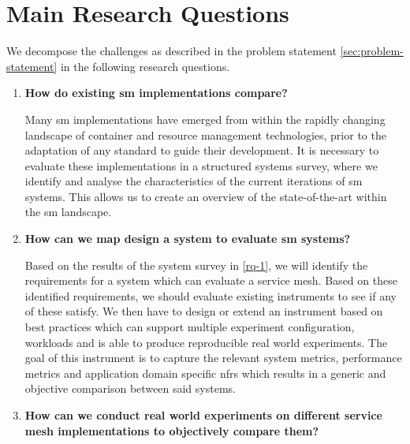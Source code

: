 \section{Main Research Questions}
\label{sec:research-questions}

We decompose the challenges as described in the problem statement \cref{sec:problem-statement} in the following research questions.




\begin{enumerate}[label=\textbf{RQ\arabic*}, leftmargin=3\parindent]
    \item \textbf{How do existing \gls{sm} implementations compare?}
    \label{rq-1}
    
    Many \gls{sm} implementations have emerged from within the rapidly changing landscape of container and resource management technologies, prior to the adaptation of any standard to guide their development. It is necessary to evaluate these implementations in a structured systems survey, where we identify and analyse the characteristics of the current iterations of \gls{sm} systems. This allows us to create an overview of the state-of-the-art within the \gls{sm} landscape.
    
    \item \textbf{How can we map design a system to evaluate \gls{sm} systems?}
    \label{rq-2}
    
    Based on the results of the system survey in \ref{rq-1}, we will identify the requirements for a system which can evaluate a service mesh. Based on these identified requirements, we should evaluate existing instruments to see if any of these satisfy. We then have to design or extend an instrument based on best practices \cite{folkerts2012benchmarking} which can support multiple experiment configuration, workloads and is able to produce reproducible real world experiments. The goal of this instrument is to capture the relevant system metrics, performance metrics and application domain specific \glspl{nfr} which results in a generic and objective comparison between said systems.

    \item \textbf{How can we conduct real world experiments on different service mesh implementations to objectively compare them?}
    \label{rq-3}
    

\end{enumerate}
